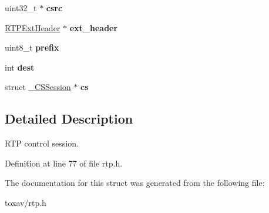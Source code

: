 \begin{DoxyCompactItemize}
\item 
\hypertarget{struct___r_t_p_session_a8bbd14e68a057e6de8ba3fa4c6afd4fa}{uint32\+\_\+t $\ast$ {\bfseries csrc}}\label{struct___r_t_p_session_a8bbd14e68a057e6de8ba3fa4c6afd4fa}

\item 
\hypertarget{struct___r_t_p_session_aa0a69d899b1bee283ae1490f53bcd073}{\hyperlink{struct___r_t_p_ext_header}{R\+T\+P\+Ext\+Header} $\ast$ {\bfseries ext\+\_\+header}}\label{struct___r_t_p_session_aa0a69d899b1bee283ae1490f53bcd073}

\item 
\hypertarget{struct___r_t_p_session_acf4a7a7457f3d922d7118075fc1a300b}{uint8\+\_\+t {\bfseries prefix}}\label{struct___r_t_p_session_acf4a7a7457f3d922d7118075fc1a300b}

\item 
\hypertarget{struct___r_t_p_session_ae5163ff230abd4115d86194ad89467b5}{int {\bfseries dest}}\label{struct___r_t_p_session_ae5163ff230abd4115d86194ad89467b5}

\item 
\hypertarget{struct___r_t_p_session_a6fa710f1d7103d0f7b2b872e33aac143}{struct \hyperlink{struct___c_s_session}{\+\_\+\+C\+S\+Session} $\ast$ {\bfseries cs}}\label{struct___r_t_p_session_a6fa710f1d7103d0f7b2b872e33aac143}

\end{DoxyCompactItemize}


\subsection{Detailed Description}
R\+T\+P control session. 

Definition at line 77 of file rtp.\+h.



The documentation for this struct was generated from the following file\+:\begin{DoxyCompactItemize}
\item 
toxav/rtp.\+h\end{DoxyCompactItemize}

